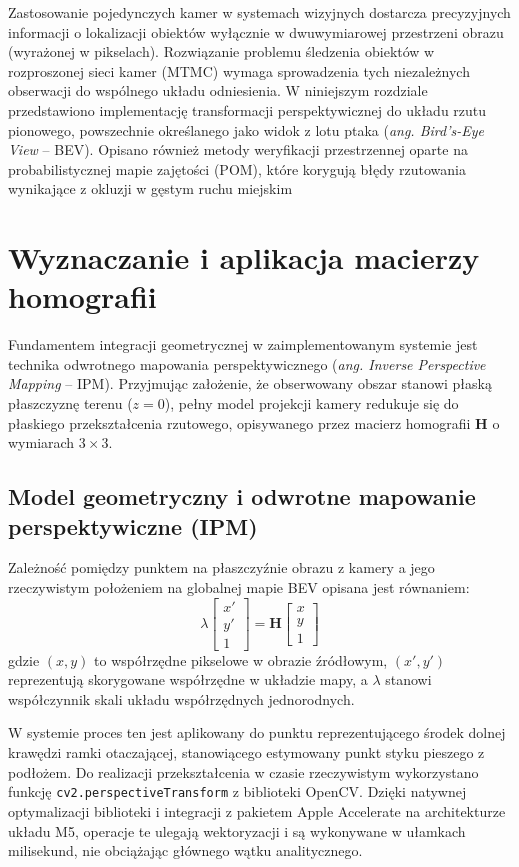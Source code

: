 Zastosowanie pojedynczych kamer w systemach wizyjnych dostarcza precyzyjnych informacji o
lokalizacji obiektów wyłącznie w dwuwymiarowej przestrzeni obrazu (wyrażonej w pikselach).
Rozwiązanie problemu śledzenia obiektów w rozproszonej sieci kamer (MTMC) wymaga sprowadzenia tych
niezależnych obserwacji do wspólnego układu odniesienia. W niniejszym rozdziale przedstawiono
implementację transformacji perspektywicznej do układu rzutu pionowego, powszechnie określanego
jako widok z lotu ptaka (\textit{ang. Bird's-Eye View} -- BEV). Opisano również metody weryfikacji
przestrzennej oparte na probabilistycznej mapie zajętości (POM), które korygują błędy rzutowania
wynikające z okluzji w gęstym ruchu miejskim

\section{Wyznaczanie i aplikacja macierzy homografii}
Fundamentem integracji geometrycznej w zaimplementowanym systemie jest technika odwrotnego
mapowania perspektywicznego (\textit{ang. Inverse Perspective Mapping} -- IPM). Przyjmując
założenie, że obserwowany obszar stanowi płaską płaszczyznę terenu ($z=0$), pełny model projekcji
kamery redukuje się do płaskiego przekształcenia rzutowego, opisywanego przez macierz homografii
$\mathbf{H}$ o wymiarach $3 \times 3$.

\subsection{Model geometryczny i odwrotne mapowanie perspektywiczne (IPM)}

Zależność pomiędzy punktem na płaszczyźnie obrazu z kamery a jego rzeczywistym położeniem na
globalnej mapie BEV opisana jest równaniem: $$ \lambda \begin{bmatrix} x' \\ y' \\ 1 \end{bmatrix} = \mathbf{H} \begin{bmatrix} x \\ y \\ 1 \end{bmatrix} $$
gdzie $(x, y)$ to współrzędne pikselowe w obrazie źródłowym, $(x', y')$ reprezentują skorygowane współrzędne w układzie mapy, a $\lambda$ stanowi współczynnik skali układu współrzędnych jednorodnych.

W systemie proces ten jest aplikowany do punktu reprezentującego środek dolnej krawędzi ramki
otaczającej, stanowiącego estymowany punkt styku pieszego z podłożem. Do realizacji przekształcenia
w czasie rzeczywistym wykorzystano funkcję \texttt{cv2.perspectiveTransform} z biblioteki OpenCV.
Dzięki natywnej optymalizacji biblioteki i integracji z pakietem Apple Accelerate na architekturze
układu M5, operacje te ulegają wektoryzacji i są wykonywane w ułamkach milisekund, nie obciążając
głównego wątku analitycznego.

